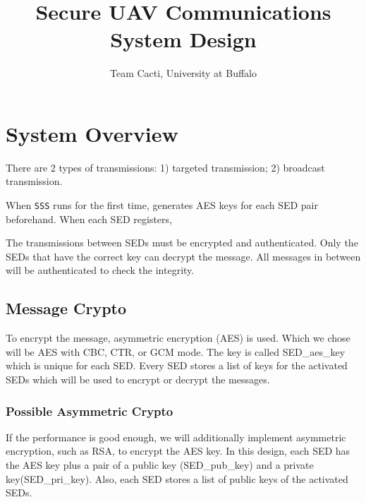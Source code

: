 \documentclass[11pt,oneside,onecolumn,letterpaper]{article}
\title{Secure UAV Communications System Design}
\author{Team Cacti, University at Buffalo}
\date{}
\begin{document}
\normalsize


\maketitle

\renewcommand{\thepage}{System Design, Cacti, UB--\arabic{page}}
\setcounter{page}{1} \normalsize
%

\newcommand{\flagRollback}{\textsf{Rollback}\xspace}

\section{System Overview}

There are 2 types of transmissions: 1) targeted transmission; 2) broadcast transmission.

When \verb|SSS| runs for the first time, generates AES keys for each SED pair beforehand. 
When each SED registers,

The transmissions between SEDs must be encrypted and authenticated.
Only the SEDs that have the correct key can decrypt the message.
All messages in between will be authenticated to check the integrity.

\subsection{Message Crypto}
To encrypt the message, asymmetric encryption (AES) is used.
Which we chose will be AES with CBC, CTR, or GCM mode.
The key is called SED\_aes\_key which is unique for each SED.
Every SED stores a list of keys for the activated SEDs which will be used to encrypt or decrypt the messages.

\subsubsection{Possible Asymmetric Crypto}
If the performance is good enough, we will additionally implement asymmetric encryption, such as RSA, to encrypt the AES key.
In this design, each SED has the AES key plus a pair of a public key (SED\_pub\_key) and a private key(SED\_pri\_key).
Also, each SED stores a list of public keys of the activated SEDs.
\end{document}
